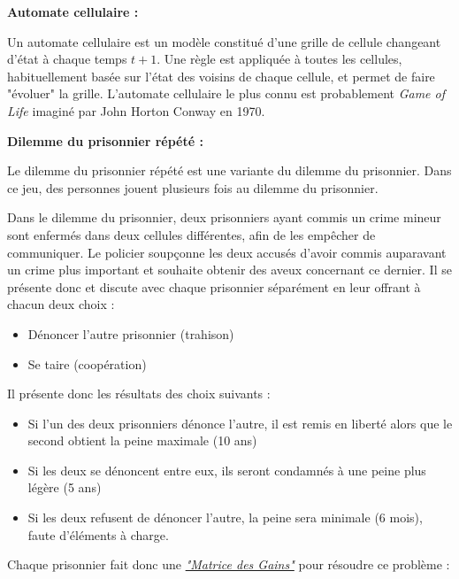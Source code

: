 \documentclass[a4paper, french]{article}
\begin{document}
\begin{framed}
        \textbf{Automate cellulaire :}
        
        Un automate cellulaire est un modèle constitué d'une grille de cellule changeant d'état à chaque temps $t+1$. Une règle est appliquée à toutes les cellules, habituellement basée sur l'état des voisins de chaque cellule, et permet de faire "évoluer" la grille. L'automate cellulaire le plus connu est probablement \textit{Game of Life} imaginé par John Horton Conway en 1970.

        \vspace{0.5cm}
        \textbf{Dilemme du prisonnier répété : } 
        
        Le dilemme du prisonnier répété est une variante du dilemme du prisonnier. Dans ce jeu, des personnes jouent plusieurs fois au dilemme du prisonnier. 
        
        Dans le dilemme du prisonnier, deux prisonniers ayant commis un crime mineur sont enfermés dans deux cellules différentes, afin de les empêcher de communiquer. Le policier soupçonne les deux accusés d'avoir commis auparavant un crime plus important et souhaite obtenir des aveux concernant ce dernier. Il se présente donc et discute avec chaque prisonnier séparément en leur offrant à chacun deux choix :
        \begin{itemize}
            \item Dénoncer l'autre prisonnier (trahison)
            \item Se taire (coopération)
        \end{itemize}
        
        Il présente donc les résultats des choix suivants :
        
        \begin{itemize}
            \item Si l'un des deux prisonniers dénonce l'autre, il est remis en liberté alors que le second obtient la peine maximale (10 ans)
        
            \item Si les deux se dénoncent entre eux, ils seront condamnés à une peine plus légère (5 ans)

            \item Si les deux refusent de dénoncer l'autre, la peine sera minimale (6 mois), faute d'éléments à charge.
        \end{itemize}
        
        Chaque prisonnier fait donc une \href{https://fr.wikipedia.org/wiki/Matrice\_des\_gains}{\textit{"Matrice des Gains"}} \cite{MatriceGains} pour résoudre ce problème :
        

\end{framed}
\end{document}
